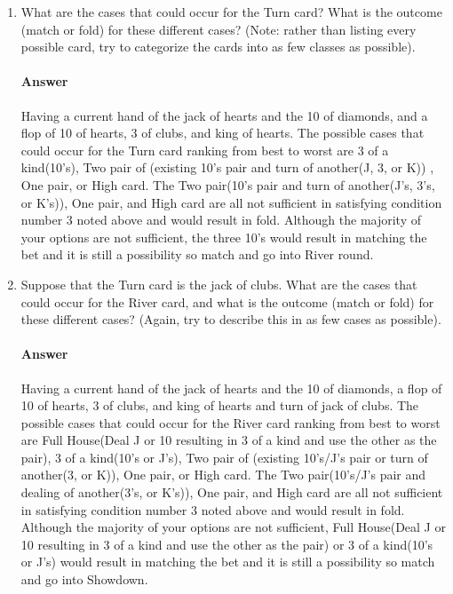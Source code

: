 \documentclass{article}
\begin{document}
\begin{enumerate}

    \item What are the cases that could occur for the Turn card?  What is the
        outcome (match or fold) for these different cases? (Note: rather than
        listing every possible card, try to categorize the cards into as few
        classes as possible).

    \paragraph{Answer}
    Having a current hand of the jack of hearts and the 10 of diamonds, and a
    flop of 10 of hearts, 3 of clubs, and king of hearts. The possible cases
    that could occur for the Turn card ranking from best to worst are 3 of a
    kind(10's), Two pair of (existing 10's pair and turn of another(J, 3, or K))
    , One pair, or High card. The Two pair(10's pair and turn of
    another(J's, 3's, or K's)), One pair, and High card are all not
    sufficient in satisfying condition number 3 noted above and would
    result in fold. Although the majority of your options are not sufficient,
     the three 10's would result in matching the bet and it is still a
     possibility so match and go into River round.

    \item Suppose that the Turn card is the jack of clubs.
        What are the cases that could occur for the River card, and what is the
        outcome (match or fold) for these different cases?  (Again, try to
        describe this in as few cases as possible).

    \paragraph{Answer}
    Having a current hand of the jack of hearts and the 10 of diamonds, a
    flop of 10
    of hearts, 3 of clubs, and king of hearts and turn of jack of clubs.
    The possible cases that could occur for the River card
    ranking from best to worst are Full House(Deal J or 10 resulting in 3
    of a kind and use the other as the pair), 3 of a kind(10's or J's),
    Two pair of (existing 10's/J's pair or turn of another(3, or K)), One
    pair, or High card. The Two pair(10's/J's pair and dealing of
    another(3's, or K's)), One pair, and High card are all not
    sufficient in satisfying condition number 3 noted above and would
    result in fold. Although the majority of your options are not sufficient,
    Full House(Deal J or 10 resulting in 3 of a kind and use the
    other as the pair) or 3 of a kind(10's or J's) would result in matching
    the bet and it is still a possibility so match and go into Showdown.

\end{enumerate}
\end{document}
